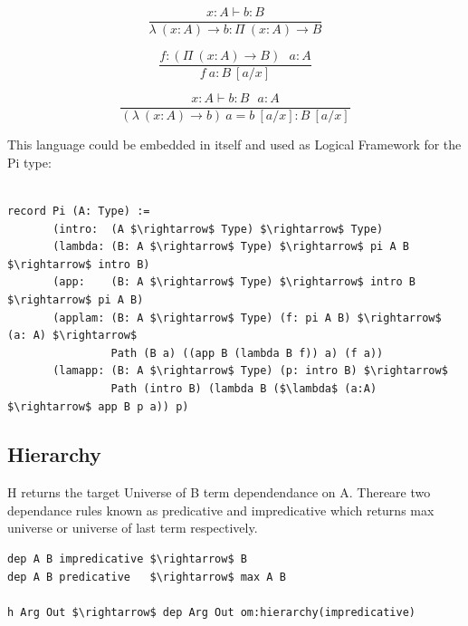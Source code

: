 \documentclass[11pt,oneside]{article}
\begin{document}
\begin{equation}
\tag{$\lambda$-intro}
\dfrac
{x:A \vdash b : B}
{\lambda\ (x:A) \rightarrow b : \Pi\ (x: A) \rightarrow B }
\end{equation}

\begin{equation}
\tag{$App$-elimination}
\dfrac
{f: (\Pi\ (x:A) \rightarrow B)\ \ \ a: A}
{f\ a : B\ [a/x]}
\end{equation}

\begin{equation}
\tag{$\beta$-computation}
\dfrac
{x:A \vdash b: B\ \ \ a:A}
{(\lambda\ (x:A) \rightarrow b)\ a = b\ [a/x] : B\ [a/x]}
\end{equation}

\vspace{0.5cm}
This language could be embedded in itself and used
as Logical Framework for the Pi type:

\vspace{0.5cm}
\begin{lstlisting}[mathescape=true]

record Pi (A: Type) :=
       (intro:  (A $\rightarrow$ Type) $\rightarrow$ Type)
       (lambda: (B: A $\rightarrow$ Type) $\rightarrow$ pi A B $\rightarrow$ intro B)
       (app:    (B: A $\rightarrow$ Type) $\rightarrow$ intro B $\rightarrow$ pi A B)
       (applam: (B: A $\rightarrow$ Type) (f: pi A B) $\rightarrow$ (a: A) $\rightarrow$
                Path (B a) ((app B (lambda B f)) a) (f a))
       (lamapp: (B: A $\rightarrow$ Type) (p: intro B) $\rightarrow$
                Path (intro B) (lambda B ($\lambda$ (a:A) $\rightarrow$ app B p a)) p)

\end{lstlisting}

\newpage

\subsection{Hierarchy}
H returns the target Universe of B term dependendance on A. Thereare two dependance rules known
as predicative and impredicative which returns max universe or universe of last term respectively.

\begin{lstlisting}[mathescape=true]
dep A B impredicative $\rightarrow$ B
dep A B predicative   $\rightarrow$ max A B

h Arg Out $\rightarrow$ dep Arg Out om:hierarchy(impredicative)
\end{lstlisting}
\end{document}
